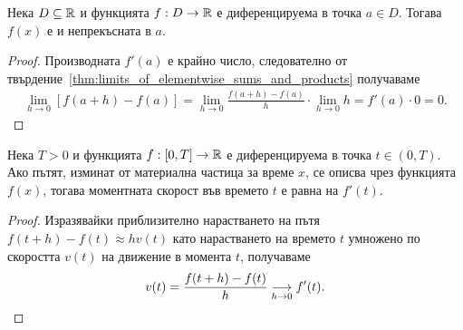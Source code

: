 \documentclass[numbers=endperiod, bibliography=totocnumbered]{scrartcl}
\begin{document}
\begin{proposition}
  Нека \( D \subseteq \R \) и функцията \( f: D \to \R \) е диференцируема в точка \( a \in D \). Тогава \( f(x) \) е и непрекъсната в \( a \).
\end{proposition}
\begin{proof}
  Производната \( f'(a) \) е крайно число, следователно от твърдение~\ref{thm:limits_of_elementwise_sums_and_products} получаваме
  \begin{align*}
    \lim_{h \to 0} [f(a+h) - f(a)]
    =
    \lim_{h \to 0} \frac {f(a+h) - f(a)} h \cdot \lim_{h \to 0} h
    =
    f'(a) \cdot 0
    =
    0.
  \end{align*}
\end{proof}

\begin{theorem}
  Нека \( T > 0 \) и функцията \( f: [0, T] \to \R \) е диференцируема в точка \( t \in (0, T) \). Ако пътят, изминат от материална частица за време \( x \), се описва чрез функцията \( f(x) \), тогава моментната скорост във времето \( t \) е равна на \( f'(t) \).
\end{theorem}
\begin{proof}
  Изразявайки приблизително нарастването на пътя \( f(t+h) - f(t) \approx h v(t) \) като нарастването на времето \( t \) умножено по скоростта \( v(t) \) на движение в момента \( t \), получаваме
  \begin{align*}
    v(t) = \frac{f(t+h) - f(t)} {h} \Conv[h \to 0]{} f'(t).
  \end{align*}
\end{proof}
\end{document}
